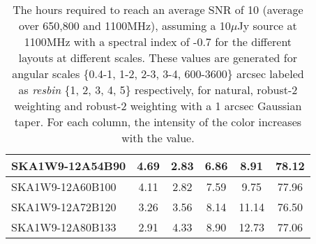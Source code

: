\begin{table}[H]
{{\begin{tabular}{|lccccc|}
SKA1W9-12A54B90 & 4.69 \cellcolor{blue!60.00} & 2.83 \cellcolor{red!18.10} & 6.86 \cellcolor{green!18.00} & 8.91 \cellcolor{orange!18.00} & 78.12 \cellcolor{purple!60.00}\\ \hline 
SKA1W9-12A60B100 & 4.11 \cellcolor{blue!46.31} & 2.82 \cellcolor{red!18.00} & 7.59 \cellcolor{green!28.25} & 9.75 \cellcolor{orange!27.24} & 77.96 \cellcolor{purple!59.00}\\ \hline 
SKA1W9-12A72B120 & 3.26 \cellcolor{blue!26.26} & 3.56 \cellcolor{red!25.16} & 8.14 \cellcolor{green!35.98} & 11.14 \cellcolor{orange!42.52} & 76.50 \cellcolor{purple!49.92}\\ \hline 
SKA1W9-12A80B133 & 2.91 \cellcolor{blue!18.00} & 4.33 \cellcolor{red!32.61} & 8.90 \cellcolor{green!46.66} & 12.73 \cellcolor{orange!60.00} & 77.06 \cellcolor{purple!53.40}\\ \hline 
\end{tabular}}
\vspace{0.000000cm}
\hspace{1cm} 
\vspace{0.000000cm}
\hspace{1cm} 

\vspace{.50cm}
\caption{The hours required to reach an average SNR of 10 (average over 650,800 and 1100MHz), assuming a 10$\mu$Jy source at 1100MHz with a spectral index of -0.7 for the different layouts at different scales. These values are generated for angular scales \{0.4-1, 1-2, 2-3, 3-4, 600-3600\} arcsec labeled as {\it resbin} \{1, 2, 3, 4, 5\} respectively, for natural, robust-2 weighting and robust-2 weighting with a 1 arcsec Gaussian taper. For each column, the intensity of the color increases with the value.}\label{tab:hours}}
 \end{table}

